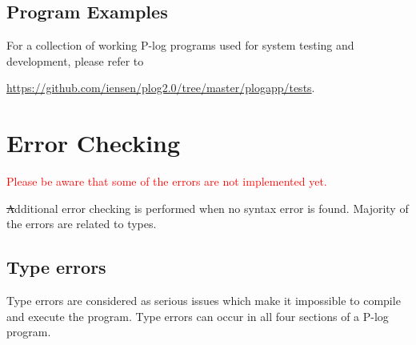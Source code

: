 \documentclass[12pt, letterpaper]{article}
\begin{document}
 \subsection{Program Examples}

 For a collection of working P-log programs used for system testing and development, please refer to
 \begin{center}
\url{https://github.com/iensen/plog2.0/tree/master/plogapp/tests}.
 \end{center}
 

 \section{Error Checking}

 \textcolor{red}{Please be aware that some of the errors are not implemented yet.}

\st
Additional error checking is performed when no syntax error is found. Majority of the errors are related to types.
\subsection{Type errors}
Type errors are considered as serious issues which make it  impossible to compile and execute the program.
Type errors can occur in all four sections of a P-log program.
\end{document}
